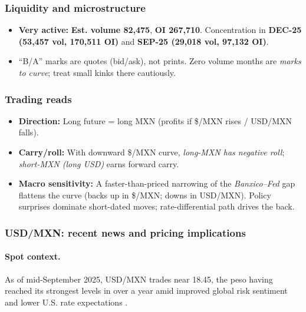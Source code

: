 \documentclass[10pt,a4paper]{article} %
\begin{document}
\subsubsection*{Liquidity and microstructure}
\begin{itemize}
  \item \textbf{Very active:} \textbf{Est. volume 82,475}, \textbf{OI 267,710}. Concentration in \textbf{DEC-25 (53,457 vol, 170,511 OI)} and \textbf{SEP-25 (29,018 vol, 97,132 OI)}.
  \item ``B/A'' marks are quotes (bid/ask), not prints. Zero volume months are \emph{marks to curve}; treat small kinks there cautiously.
\end{itemize}

\subsubsection*{Trading reads}
\begin{itemize}
  \item \textbf{Direction:} Long future = long MXN (profits if \$/MXN rises / USD/MXN falls).
  \item \textbf{Carry/roll:} With downward \$/MXN curve, \emph{long-MXN has negative roll}; \emph{short-MXN (long USD)} earns forward carry.
  \item \textbf{Macro sensitivity:} A faster-than-priced narrowing of the \emph{Banxico--Fed} gap flattens the curve (backs up in \$/MXN; downs in USD/MXN). Policy surprises dominate short-dated moves; rate-differential path drives the back.
\end{itemize}

\subsubsection{USD/MXN: recent news and pricing implications}
\paragraph{Spot context.}
As of mid-September 2025, USD/MXN trades near 18.45, the peso having reached its strongest levels in over a year amid improved global risk sentiment and lower U.S. rate expectations \citep{reuters_usdmxn_quote,reuters_mx_markets_11sep,reuters_mx_markets_12sep}.
\end{document}
